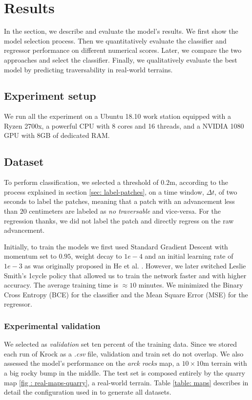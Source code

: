 \documentclass[../document.tex]{subfiles}
\begin{document}
\chapter{Results}
\label{chap: results}
In the section, we describe and evaluate the model's results. We first show the model selection process. Then we quantitatively evaluate the classifier and regressor performance on different numerical scores. Later, we compare the two approaches and select the classifier. Finally, we qualitatively evaluate the best model by predicting traversability in real-world terrains. 
\section{Experiment setup}
We run all the experiment on a Ubuntu 18.10  work station equipped with a Ryzen 2700x, a powerful CPU with 8 cores and 16 threads, and a NVIDIA 1080 GPU with 8GB of dedicated RAM.
\section{Dataset}
To perform classification, we selected a threshold of $0.2$m, according to the process explained in section \ref{sec: label-patches}, on a time window, $\Delta t$, of two seconds to label the patches, meaning that a patch with an advancement less than $20$ centimeters are labeled as \emph{no traversable} and vice-versa. For the regression thanks, we did not label the patch and directly regress on the raw advancement.

Initially, to train the models we first used Standard Gradient Descent with momentum set to $0.95$, weight decay to $1e-4$ and an initial learning rate of $1e-3$ as was originally proposed in He et al. \cite{he2015deep}. However, we later switched Leslie Smith's 1cycle policy \cite{1cycle} that allowed us to train the network faster and with higher accuracy. The average training time is $\approx 10$ minutes. We minimized the Binary Cross Entropy (BCE) for the classifier and the  Mean Square Error (MSE) for the regressor.
\subsection{Experimental validation}
We selected as \emph{validation} set ten percent of the training data. Since we stored each run of Krock as a \emph{.csv} file, validation and train set do not overlap. We also assessed the model's performance on the \emph{arck rocks} map, a $10\times10$m terrain with a big rocky bump in the middle.
The test set is composed entirely by the quarry map \ref{fig : real-maps-quarry}, a real-world terrain. Table \ref{table: maps} describes in detail the configuration used in to generate all datasets.
\end{document}
